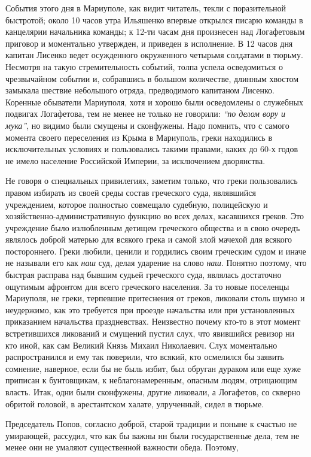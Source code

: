 \documentclass[a4paper,20pt]{report}
\begin{document}
События этого дня в Мариуполе, как видит читатель, текли с поразительной
быстротой; около 10 часов утра Ильяшенко впервые открылся писарю команды в
канцелярии начальника команды; к 12-ти часам дня произнесен над Логафетовым
приговор и моментально утвержден, и приведен в исполнение. В 12 часов дня
капитан Лисенко ведет осужденного окруженного четырьмя солдатами в тюрьму.
Несмотря на такую стремительность событий, толпа успела осведомиться о
чрезвычайном событии и, собравшись в большом количестве, длинным хвостом
замыкала шествие небольшого отряда, предводимого капитаном Лисенко.  Коренные
обыватели Мариуполя, хотя и хорошо были осведомлены о служебных подвигах
Логафетова, тем не менее не только не говорили: \emph{``по делом вору и
мука''}, но видимо были смущены и сконфужены. Надо помнить, что с самого
момента своего переселения из Крыма в Мариуполь, греки находились в
исключительных условиях и пользовались такими правами, каких до 60-х годов не
имело население Российской Империи, за исключением дворянства.

Не говоря о специальных привилегиях, заметим только, 
что греки пользовались правом избирать из своей
среды состав греческого суда, являвшийся учреждением,
которое полностью совмещало судебную, 
полицейскую и хозяйственно-административную функцию во всех делах, касавшихся
греков. Это учреждение было излюбленным детищем
греческого общества и в свою очередъ являлось доброй
матерью для всякого грека и самой злой мачехой для всякого
постороннего. Греки любили, ценили и гордились своим
греческим судом и иначе не называли его как \emph{наш}
суд, делая ударение на слово \emph{наш}. Понятно поэтому, что
быстрая расправа над бывшим судьей греческого суда,
являлась достаточно ощутимым афронтом для всего греческого населения.  За то
новые поселенцы Мариуполя, не греки, терпевшие притеснения от греков, ликовали
столь шумно и неудержимо, как это требуется при проезде начальства или при
установленных приказанием начальства праздневствах. Неизвестно почему кто-то в
этот момент встретившихся ликований и смущений пустил слух, что явившийся
ревизор ни кто иной, как сам Великий Князь Михаил Николаевич. Слух моментально
распространился и ему так поверили, что всякий, кто осмелился бы заявить
сомнение, наверное, если бы не быль избит, был обруган дураком или еще хуже
приписан к бунтовщикам, к неблагонамеренным, опасным людям, отрицающим власть.
Итак, одни были сконфужены, другие ликовали, а Логафетов, со скверно обритой
головой, в арестантском халате, улрученный, сидел в тюрьме.

Председатель Попов, согласно доброй, старой традиции
и поныне к счастью не умирающей, рассудил, что как
бы важны нн были государственные дела, тем не менее
они не умаляют существенной важности обеда. Поэтому,
\end{document}

